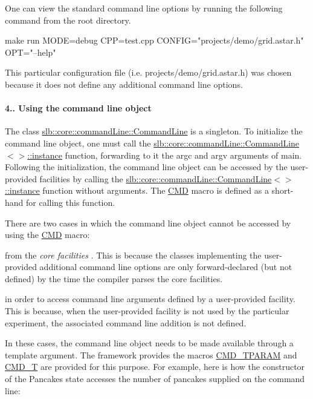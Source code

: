 One can view the standard command line options by running the following command from the root directory. \begin{DoxyVerb}make run MODE=debug CPP=test.cpp CONFIG="projects/demo/grid.astar.h" OPT="--help"
\end{DoxyVerb}
 This particular configuration file (i.\+e. {\ttfamily projects/demo/grid.\+astar.\+h}) was chosen because it does not define any additional command line options.\hypertarget{index_s-singleton}{}\paragraph{4.. Using the command line object}\label{index_s-singleton}
The class \hyperlink{structslb_1_1core_1_1commandLine_1_1CommandLine}{slb\+::core\+::command\+Line\+::\+Command\+Line} is a singleton. To initialize the command line object, one must call the \hyperlink{structslb_1_1core_1_1commandLine_1_1CommandLine_a297df54d1f330d491717b487968b0fc5}{slb\+::core\+::command\+Line\+::\+Command\+Line$<$$>$\+::instance} function, forwarding to it the {\ttfamily argc} and {\ttfamily argv} arguments of {\ttfamily main}. Following the initialization, the command line object can be accessed by the user-\/provided facilities by calling the \hyperlink{structslb_1_1core_1_1commandLine_1_1CommandLine_a297df54d1f330d491717b487968b0fc5}{slb\+::core\+::command\+Line\+::\+Command\+Line$<$$>$\+::instance} function without arguments. The \hyperlink{command__line_8h_a0a5ceb9ceb914e08d345410b561cb37a}{C\+MD} macro is defined as a short-\/hand for calling this function.

There are two cases in which the command line object cannot be accessed by using the \hyperlink{command__line_8h_a0a5ceb9ceb914e08d345410b561cb37a}{C\+MD} macro\+:
\begin{DoxyItemize}
\item from the {\itshape core facilities} . This is because the classes implementing the user-\/provided additional command line options are only forward-\/declared (but not defined) by the time the compiler parses the core facilities.
\item in order to access command line arguments defined by a user-\/provided facility. This is because, when the user-\/provided facility is not used by the particular experiment, the associated command line addition is not defined.
\end{DoxyItemize}

In these cases, the command line object needs to be made available through a template argument. The framework provides the macros \hyperlink{command__line_8h_afba6f100063f1d8dec752ed393ff4e92}{C\+M\+D\+\_\+\+T\+P\+A\+R\+AM} and \hyperlink{command__line_8h_ad2bdd5f5511ceff17570c461fe447a56}{C\+M\+D\+\_\+T} are provided for this purpose. For example, here is how the constructor of the Pancake\textquotesingle{}s state accesses the number of pancakes supplied on the command line\+:


